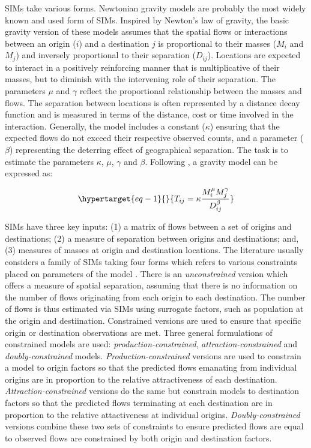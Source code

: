 \documentclass[
  a4paper, 
  twoside,
  final
]{article}
\begin{document}
SIMs take various forms. Newtonian gravity models are probably the most
widely known and used form of SIMs. Inspired by Newton's law of gravity,
the basic gravity version of these models assumes that the spatial flows
or interactions between an origin (\(i\)) and a destination \(j\) is
proportional to their masses (\(M_{i}\) and \(M_{j}\)) and inversely
proportional to their separation (\(D_{ij}\)). Locations are expected to
interact in a positively reinforcing manner that is multiplicative of
their masses, but to diminish with the intervening role of their
separation. The parameters \(\mu\) and \(\gamma\) reflect the
proportional relationship between the masses and flows. The separation
between locations is often represented by a distance decay function and
is measured in terms of the distance, cost or time involved in the
interaction. Generally, the model includes a constant (\(\kappa\))
ensuring that the expected flows do not exceed their respective observed
counts, and a parameter (\(\beta\)) representing the deterring effect of
geographical separation. The task is to estimate the parameters
\(\kappa\), \(\mu\), \(\gamma\) and \(\beta\). Following
\citet{wilson1971}, a gravity model can be expressed as:

\begin{equation}\protect\hypertarget{eq-1}{}{
T_{ij} = \kappa \frac{M^{\mu}_{i} M^{\gamma}_{j}}{D^{\beta}_{ij} }
}\label{eq-1}\end{equation}

SIMs have three key inputs: (1) a matrix of flows between a set of
origins and destinations; (2) a measure of separation between origins
and destinations; and, (3) measures of masses at origin and destination
locations. The literature usually considers a family of SIMs taking four
forms which refers to various constraints placed on parameters of the
model \citep{wilson1971}. There is an \emph{unconstrained} version which
offers a measure of spatial separation, assuming that there is no
information on the number of flows originating from each origin to each
destination. The number of flows is thus estimated via SIMs using
surrogate factors, such as population at the origin and destiination.
Constrained versions are used to ensure that specific origin or
destination observations are met. Three general formulations of
constrained models are used: \emph{production-constrained},
\emph{attraction-constrained} and \emph{doubly-constrained} models.
\emph{Production-constrained} versions are used to constrain a model to
origin factors so that the predicted flows emanating from individual
origins are in proportion to the relative attractiveness of each
destination. \emph{Attraction-constrained} versions do the same but
constrain models to destination factors so that the predicted flows
terminating at each destination are in proportion to the relative
attactiveness at individual origins. \emph{Doubly-constrained} versions
combine these two sets of constraints to ensure predicted flows are
equal to observed flows are constrained by both origin and destination
factors.
\end{document}

